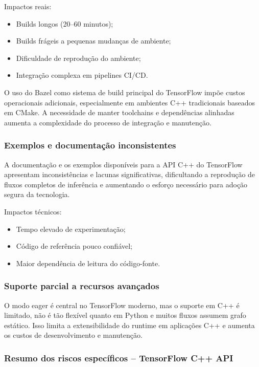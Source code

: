 Impactos reais:

\begin{itemize} 
    \item Builds longos (20–60 minutos);
    \item Builds frágeis a pequenas mudanças de ambiente;
    \item Dificuldade de reprodução do ambiente;
    \item Integração complexa em pipelines CI/CD.
\end{itemize}

O uso do Bazel como sistema de build principal do TensorFlow impõe custos operacionais adicionais, especialmente em ambientes C++ tradicionais baseados em CMake. A necessidade de manter toolchains e dependências alinhadas aumenta a complexidade do processo de integração e manutenção.

\subsubsection{Exemplos e documentação inconsistentes}

A documentação e os exemplos disponíveis para a API C++ do TensorFlow apresentam inconsistências e lacunas significativas, dificultando a reprodução de fluxos completos de inferência e aumentando o esforço necessário para adoção segura da tecnologia.

Impactos técnicos:

\begin{itemize} 
    \item Tempo elevado de experimentação;
    \item Código de referência pouco confiável;
    \item Maior dependência de leitura do código-fonte.
\end{itemize}

\subsubsection{Suporte parcial a recursos avançados}

O modo eager é central no TensorFlow moderno, mas o suporte em C++ é limitado, não é tão flexível quanto em Python e muitos fluxos assumem grafo estático. Isso limita a extensibilidade do runtime em aplicações C++ e aumenta os custos de desenvolvimento e manutenção.

\subsubsection{Resumo dos riscos específicos – TensorFlow C++ API}

